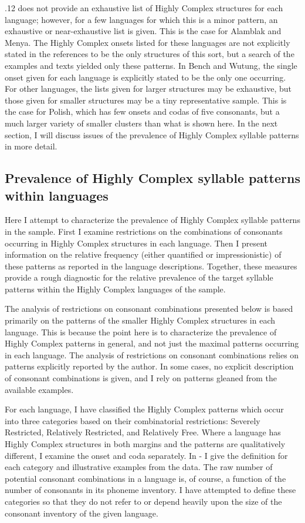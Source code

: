   .12 does not provide an exhaustive list of Highly Complex structures for each language; however, for a few languages for which this is a minor pattern, an exhaustive or near-exhaustive list is given. This is the case for Alamblak and Menya. The Highly Complex onsets listed for these languages are not explicitly stated in the references to be the only structures of this sort, but a search of the examples and texts yielded only these patterns. In Bench and Wutung, the single onset given for each language is explicitly stated to be the only one occurring. For other languages, the lists given for larger structures may be exhaustive, but those given for smaller structures may be a tiny representative sample. This is the case for Polish, which has few onsets and codas of five consonants, but a much larger variety of smaller clusters than what is shown here. In the next section, I will discuss issues of the prevalence of Highly Complex syllable patterns in more detail.

\subsection{Prevalence of Highly Complex syllable patterns within languages}\label{sec:3.4.2}

  Here I attempt to characterize the prevalence of Highly Complex syllable patterns in the sample. First I examine restrictions on the combinations of consonants occurring in Highly Complex structures in each language. Then I present information on the relative frequency (either quantified or impressionistic) of these patterns as reported in the language descriptions. Together, these measures provide a rough diagnostic for the relative prevalence of the target syllable patterns within the Highly Complex languages of the sample.

  The analysis of restrictions on consonant combinations presented below is based primarily on the patterns of the smaller Highly Complex structures in each language. This is because the point here is to characterize the prevalence of Highly Complex patterns in general, and not just the maximal patterns occurring in each language. The analysis of restrictions on consonant combinations relies on patterns explicitly reported by the author. In some cases, no explicit description of consonant combinations is given, and I rely on patterns gleaned from the available examples. 

  For each language, I have classified the Highly Complex patterns which occur into three categories based on their combinatorial restrictions: Severely Restricted, Relatively Restricted, and Relatively Free. Where a language has Highly Complex structures in both margins and the patterns are qualitatively different, I examine the onset and coda separately. In - I give the definition for each category and illustrative examples from the data. The raw number of potential consonant combinations in a language is, of course, a function of the number of consonants in its phoneme inventory. I have attempted to define these categories so that they do not refer to or depend heavily upon the size of the consonant inventory of the given language.

